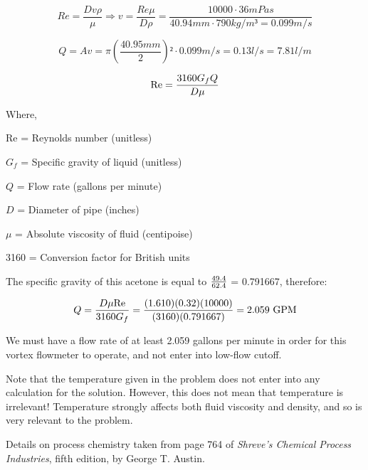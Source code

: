 





$$Re=\frac{Dv \rho}{\mu} \Rightarrow v=\frac{Re\mu}{D\rho}=\frac{10000\cdot36mPas}{40.94mm\cdot790kg/m³=0.099 m/s}$$

$$Q=Av=\pi(\frac{40.95mm}{2})²\cdot 0.099m/s=0.13l/s=7.81l/m$$






$$\hbox{Re} = {{3160 G_f Q} \over {D \mu}}$$

\noindent
Where,

Re = Reynolds number (unitless)

$G_f$ = Specific gravity of liquid (unitless)

$Q$ = Flow rate (gallons per minute)

$D$ = Diameter of pipe (inches)

$\mu$ = Absolute viscosity of fluid (centipoise)

3160 = Conversion factor for British units

\vskip 10pt

The specific gravity of this acetone is equal to $49.4 \over 62.4$ = 0.791667, therefore:

$$Q = {D \mu \hbox{Re} \over 3160 G_f} = {(1.610)(0.32)(10000) \over (3160)(0.791667)} = 2.059 \hbox{ GPM}$$

\vskip 10pt

We must have a flow rate of at least 2.059 gallons per minute in order for this vortex flowmeter to operate, and not enter into low-flow cutoff.

\vskip 10pt

Note that the temperature given in the problem does not enter into any calculation for the solution.  However, this does not mean that temperature is irrelevant!  Temperature strongly affects both fluid viscosity and density, and so is very relevant to the problem.

\vskip 10pt

Details on process chemistry taken from page 764 of {\it Shreve's Chemical Process Industries}, fifth edition, by George T. Austin.




